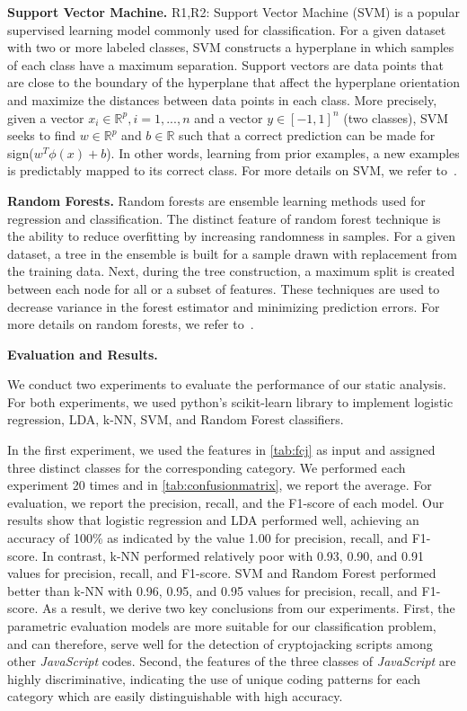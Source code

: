 \documentclass[acmlarge]{acmart}
\newcommand{\BfPara}[1]{{\noindent\bf#1.}\xspace\xspace}
\newcommand{\js}{{\em JavaScript}\xspace}
\newcommand{\cj}{cryptojacking\xspace}
\begin{document}
{{\color{blue}
\BfPara{Support Vector Machine}R1,R2: Support Vector Machine (SVM) is a popular supervised learning model commonly used for classification. For a given dataset with two or more labeled classes, SVM constructs a hyperplane in which samples of each class have a maximum separation. Support vectors are data points that are close to the boundary of the hyperplane that affect the hyperplane orientation and maximize the distances between data points in each class. More precisely, given a vector $x_{i}\in\mathbb{R}^{p}, i=1,...,n$ and a vector $y\in [-1,1]^{n}$ (two classes), SVM seeks to find $w\in\mathbb{R}^{p}$ and $b\in\mathbb{R}$ such that a correct prediction can be made for sign($w^{T}\phi(x)+b$). In other words, learning from prior examples, a new examples is predictably mapped to its correct class. For more details on SVM, we refer to~\cite{ByunL02}. 

\BfPara{Random Forests} Random forests are ensemble learning methods used for regression and classification. The distinct feature of random forest technique is the ability to reduce overfitting by increasing randomness in samples. For a given dataset, a tree in the ensemble is built for a sample drawn with replacement from the training data. Next, during the tree construction, a maximum split is created between each node for all or a subset of features. These techniques are used to decrease variance in the forest estimator and minimizing prediction errors. For more details on random forests, we refer to~\cite{VerikasGB11}.
}




\BfPara{Evaluation and Results} {\color{blue} We conduct two experiments to evaluate the performance of our static analysis. For both experiments, we used python's scikit-learn library to implement logistic regression, LDA, k-NN, SVM, and Random Forest classifiers. 

In the first experiment, we used the features in \autoref{tab:fcj} as input and assigned three distinct classes for the corresponding category. We performed each experiment 20 times and in \autoref{tab:confusionmatrix}, we report the average. For evaluation, we report the precision, recall, and the F1-score of each model. Our results show that logistic regression and LDA performed well, achieving an accuracy of 100\% as indicated by the value 1.00 for precision, recall, and F1-score. In contrast, k-NN performed relatively poor with 0.93, 0.90, and 0.91 values for precision, recall, and F1-score. SVM and Random Forest performed better than k-NN with 0.96, 0.95, and 0.95 values for precision, recall, and F1-score. As a result, we derive two key conclusions from our experiments. First, the parametric evaluation models are more suitable for our classification problem, and can therefore, serve well for the detection of \cj scripts among other \js codes. Second, the features of the three classes of \js are highly discriminative, indicating the use of unique coding patterns for each category which are easily distinguishable with high accuracy.

}}
\end{document}
